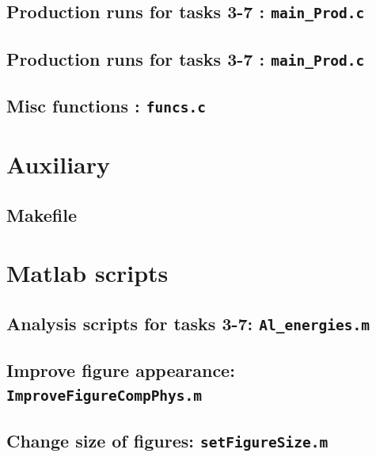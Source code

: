 \subsection{Production runs for tasks 3-7 : \texttt{main\_Prod.c}}


\subsection{Production runs for tasks 3-7 : \texttt{main\_Prod.c}}



\subsection{Misc functions : \texttt{funcs.c}}


\section{Auxiliary }
\subsection{Makefile}




\section{Matlab scripts}
\subsection{Analysis scripts for tasks 3-7: \texttt{Al\_energies.m}}


\subsection{Improve figure appearance: \texttt{ImproveFigureCompPhys.m}}


\subsection{Change size of figures: \texttt{setFigureSize.m}}



